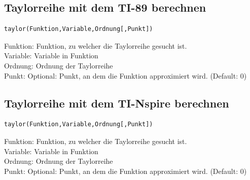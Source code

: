 \ifti
\subsection{Taylorreihe mit dem TI-89 berechnen}
\begin{verbatim}
taylor(Funktion,Variable,Ordnung[,Punkt])
\end{verbatim}
Funktion: Funktion, zu welcher die Taylorreihe gesucht ist. \\
Variable: Variable in Funktion\\
Ordnung: Ordnung der Taylorreihe\\
Punkt: Optional: Punkt, an dem die Funktion approximiert wird. (Default: 0)
\fi
\ifnspire
\subsection{Taylorreihe mit dem TI-Nspire berechnen}
\begin{verbatim}
taylor(Funktion,Variable,Ordnung[,Punkt])
\end{verbatim}
Funktion: Funktion, zu welcher die Taylorreihe gesucht ist. \\
Variable: Variable in Funktion\\
Ordnung: Ordnung der Taylorreihe\\
Punkt: Optional: Punkt, an dem die Funktion approximiert wird. (Default: 0)
\fi
